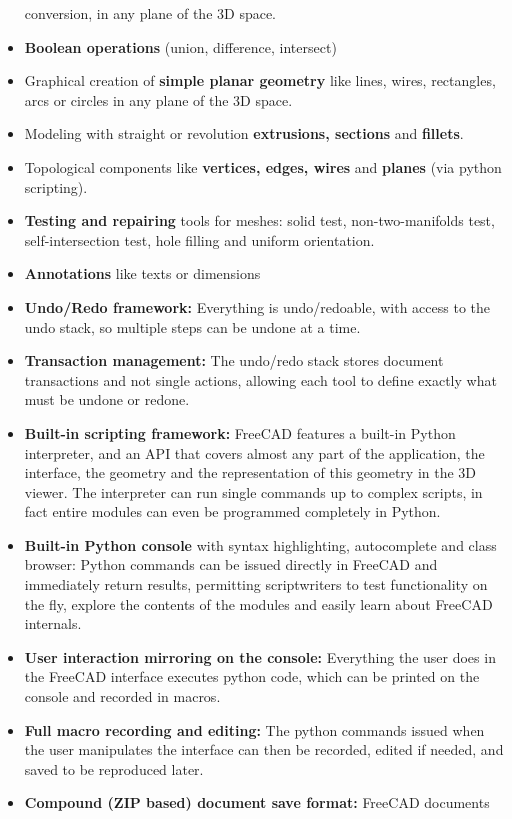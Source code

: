 \begin{itemize}
conversion, in any plane of the 3D space.
\item \textbf{Boolean operations} (union, difference, intersect)
\item Graphical creation of \textbf{simple planar geometry} like lines, wires, 
rectangles, arcs or circles in any plane of the 3D space.
\item Modeling with straight or revolution \textbf{extrusions, sections} and 
\textbf{fillets}.
\item Topological components like \textbf{vertices, edges, wires} and \textbf{planes} 
(via python scripting).
\item \textbf{Testing and repairing} tools for meshes: solid test, non-two-manifolds 
test, self-intersection test, hole filling and uniform orientation.
\item \textbf{Annotations} like texts or dimensions
\item \textbf{Undo/Redo framework:} Everything is undo/redoable, with access to 
the undo stack, so multiple steps can be undone at a time.
\item \textbf{Transaction management:} The undo/redo stack stores document transactions 
and not single actions, allowing each tool to define exactly what must be 
undone or redone.
\item \textbf{Built-in scripting framework:} FreeCAD features a built-in Python 
interpreter, and an API that covers almost any part of the application, 
the interface, the geometry and the representation of this geometry in the 
3D viewer. The interpreter can run single commands up to complex scripts, 
in fact entire modules can even be programmed completely in Python.
\item \textbf{Built-in Python console} with syntax highlighting, autocomplete 
and class browser: Python commands can be issued directly in FreeCAD and 
immediately return results, permitting scriptwriters to test functionality 
on the fly, explore the contents of the modules and easily learn about 
FreeCAD internals.
\item \textbf{User interaction mirroring on the console:} Everything the user 
does in the FreeCAD interface executes python code, which can be printed 
on the console and recorded in macros.
\item \textbf{Full macro recording and editing:} The python commands issued when 
the user manipulates the interface can then be recorded, edited if needed, 
and saved to be reproduced later.
\item \textbf{Compound (ZIP based) document save format:} FreeCAD documents 

\end{itemize}
